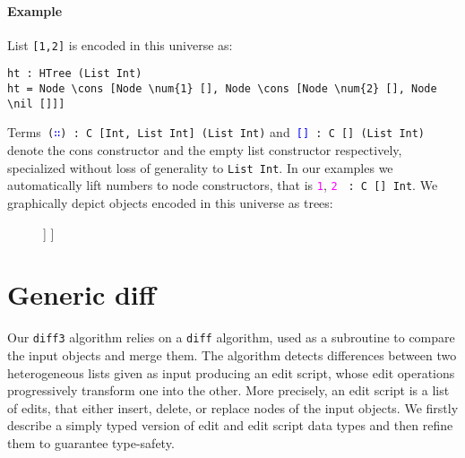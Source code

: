 \documentclass{sigplanconf}
\theoremstyle{plain}
\newcommand{\nil}{\textcolor{blue}{\texttt{[]}}}
\newcommand{\cons}{\texttt{(\textcolor{blue}{∷})}}
\newcommand{\num}[1]{\textcolor{magenta}{\texttt{#1}}}
\begin{document}
\paragraph{Example}
List \texttt{[1,2]} is encoded in this universe as:
\begin{Verbatim}[commandchars=\\\{\}]
ht : HTree (List Int)
ht = Node \cons [Node \num{1} [], Node \cons [Node \num{2} [], Node \nil []]]
\end{Verbatim}
Terms\texttt{ }\cons \texttt{ : C [Int, List Int] (List Int)}
and\texttt{ }\nil \texttt{ : C [] (List Int)} denote the cons
constructor and the empty list constructor respectively, specialized
without loss of generality to \texttt{List Int}.
%
In our examples we automatically lift numbers to node constructors,
that is \num{1}, \num{2} \texttt{ : C [] Int}.
%
We graphically depict objects encoded in this universe as trees:

\begin{figure}[h]
\centering
\Tree
[.{\cons}
   [.{\num{1}} ]
   [.{\cons} [.{\num{2}} ] [.{\nil} ]]
]
\end{figure}
	
	
\section{Generic diff}
\label{sec:generic-diff}
Our \texttt{diff3} algorithm relies on a \texttt{diff} algorithm, used
as a subroutine to compare the input objects and merge them.
%
The algorithm detects differences between two heterogeneous lists
given as input producing an edit script, whose edit operations
progressively transform one into the other.
%
More precisely, an edit script is a list of edits, that either insert,
delete, or replace nodes of the input objects.
%
We firstly describe a simply typed version of edit and edit script
data types and then refine them to guarantee type-safety.
\end{document}
